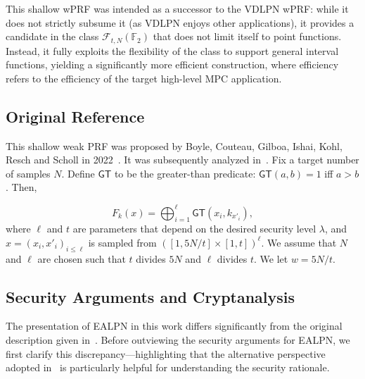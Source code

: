 \documentclass[journal=tosc,submission]{iacrtrans}
\theoremstyle{theorem}
\newcommand\setF{\ensuremath{\mathcal{F}}\xspace}
\renewcommand\secpar{\ensuremath{\lambda}\xspace}
\newcommand\GT{\ensuremath{\mathsf{GT}}\xspace}
\newcommand\F{\mathbb{F}}
\begin{document}
This shallow wPRF was intended as a successor to the {\sf VDLPN} wPRF: while it does not strictly subsume it (as {\sf VDLPN} enjoys other applications), it provides a candidate in the class $\setF_{t,N}(\F_2)$ that does not limit itself to point functions. Instead, it fully exploits the flexibility of the class to support general interval functions, yielding a significantly more efficient construction, where efficiency refers to the efficiency of the target high-level MPC application.

\subsection{Original Reference}
\label{subsec:original-reference-ealpn}

This shallow weak PRF was proposed by Boyle, Couteau, Gilboa, Ishai, Kohl, Resch and Scholl in 2022~\cite{C:BCGIKR22}. It was subsequently analyzed in~\cite{C:RagRinTan23}. Fix a target number of samples $N$. Define $\GT$ to be the greater-than predicate: $\GT(a,b) = 1$ iff $a > b$. Then,

\begin{equation}\label{eq:ealpn}
F_k(x) = \bigoplus_{i=1}^\ell \GT(x_i, k_{x'_i}),
\end{equation}
where $\ell$ and $t$ are parameters that depend on the desired security level $\secpar$, and $x = (x_i,x'_i)_{i \leq \ell}$ is sampled from $([1,5N/t]\times [1,t])^\ell$. We assume that $N$ and $\ell$ are chosen such that $t$ divides $5N$ and $\ell$ divides $t$. We let $w = 5N/t$.

\subsection{Security Arguments and Cryptanalysis}

The presentation of {\sf EALPN} in this work differs significantly from the original description given in~\cite{C:BCGIKR22}. Before outviewing the security arguments for {\sf EALPN}, we first clarify this discrepancy—highlighting that the alternative perspective adopted in~\cite{C:BCGIKR22} is particularly helpful for understanding the security rationale.
\end{document}

